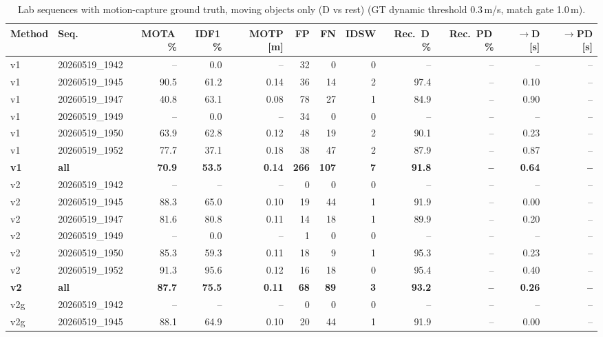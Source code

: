 \begin{table}[t]
\centering
\caption{Lab sequences with motion-capture ground truth, moving objects only (D vs rest) (GT dynamic threshold 0.3\,m/s, match gate 1.0\,m).}
\label{tab:own_r8a_dynamic_only}
\setlength{\tabcolsep}{3pt}
\begin{tabular}{llrrrrrrrrrr}
\toprule
Method & Seq. & MOTA\,\% & IDF1\,\% & MOTP [m] & FP & FN & IDSW & Rec.\ D\,\% & Rec.\ PD\,\% & $\to$D [s] & $\to$PD [s] \\
\midrule
v1 & 20260519\_1942 & -- & 0.0 & -- & 32 & 0 & 0 & -- & -- & -- & -- \\
v1 & 20260519\_1945 & 90.5 & 61.2 & 0.14 & 36 & 14 & 2 & 97.4 & -- & 0.10 & -- \\
v1 & 20260519\_1947 & 40.8 & 63.1 & 0.08 & 78 & 27 & 1 & 84.9 & -- & 0.90 & -- \\
v1 & 20260519\_1949 & -- & 0.0 & -- & 34 & 0 & 0 & -- & -- & -- & -- \\
v1 & 20260519\_1950 & 63.9 & 62.8 & 0.12 & 48 & 19 & 2 & 90.1 & -- & 0.23 & -- \\
v1 & 20260519\_1952 & 77.7 & 37.1 & 0.18 & 38 & 47 & 2 & 87.9 & -- & 0.87 & -- \\
\textbf{v1} & \textbf{all} & \textbf{70.9} & \textbf{53.5} & \textbf{0.14} & \textbf{266} & \textbf{107} & \textbf{7} & \textbf{91.8} & \textbf{--} & \textbf{0.64} & \textbf{--} \\
\midrule
v2 & 20260519\_1942 & -- & -- & -- & 0 & 0 & 0 & -- & -- & -- & -- \\
v2 & 20260519\_1945 & 88.3 & 65.0 & 0.10 & 19 & 44 & 1 & 91.9 & -- & 0.00 & -- \\
v2 & 20260519\_1947 & 81.6 & 80.8 & 0.11 & 14 & 18 & 1 & 89.9 & -- & 0.20 & -- \\
v2 & 20260519\_1949 & -- & 0.0 & -- & 1 & 0 & 0 & -- & -- & -- & -- \\
v2 & 20260519\_1950 & 85.3 & 59.3 & 0.11 & 18 & 9 & 1 & 95.3 & -- & 0.23 & -- \\
v2 & 20260519\_1952 & 91.3 & 95.6 & 0.12 & 16 & 18 & 0 & 95.4 & -- & 0.40 & -- \\
\textbf{v2} & \textbf{all} & \textbf{87.7} & \textbf{75.5} & \textbf{0.11} & \textbf{68} & \textbf{89} & \textbf{3} & \textbf{93.2} & \textbf{--} & \textbf{0.26} & \textbf{--} \\
\midrule
v2g & 20260519\_1942 & -- & -- & -- & 0 & 0 & 0 & -- & -- & -- & -- \\
v2g & 20260519\_1945 & 88.1 & 64.9 & 0.10 & 20 & 44 & 1 & 91.9 & -- & 0.00 & -- \\

\end{tabular}
\end{table}
